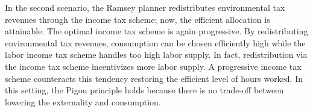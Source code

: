 %
In the second scenario, the Ramsey planner redistributes environmental tax revenues through the income tax scheme; now, the efficient allocation is attainable. The optimal income tax scheme is again progressive. By redistributing environmental tax revenues, consumption can be chosen efficiently high while the labor income tax scheme handles too high labor supply. In fact, redistribution via the income tax scheme incentivizes more labor supply. A progressive income tax scheme counteracts this tendency restoring the efficient level of hours worked. 
In this setting, the Pigou principle holds because there is no trade-off between lowering the externality and consumption.
% 
% 
% 



